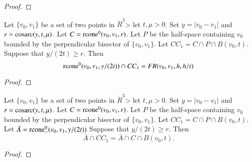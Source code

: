 \begin{tarskidata}
\begin{tarski}
\begin{proof}
\end{proof}
\end{tarski}






\begin{tarski}

\begin{lemma}
Let $\{v_0,v_1\}$ be a set of two points in $\ring{R}^3$>
let $t,\mu > 0$.  Set $y=|v_0-v_1|$
and $r={\operatorname{cosarc}}(y,t,\mu)$.
Let $C={\operatorname{rcone}}^0(v_0,v_1,r)$.
Let $P$ be the half-space containing $v_0$ bounded by
the perpendicular bisector of  $\{v_0,v_1\}$.
Let $CC_1 = C\cap P \cap B(v_0,t)$.
Suppose that $y/(2t) \ge r$.
Then
  $$
  {\operatorname{rcone}}^0(v_0,v_1,y/(2t))\cap CC_1 = FR(v_0,v_1,h,h/t)
  $$
\end{lemma}

\begin{proof}
\end{proof}
\end{tarski}





\begin{tarski}

\begin{lemma}
Let $\{v_0,v_1\}$ be a set of two points in $\ring{R}^3$>
let $t,\mu > 0$.  Set $y=|v_0-v_1|$
and $r={\operatorname{cosarc}}(y,t,\mu)$.
Let $C={\operatorname{rcone}}^0(v_0,v_1,r)$.
Let $P$ be the half-space containing $v_0$ bounded by
the perpendicular bisector of  $\{v_0,v_1\}$.
Let $CC_1 = C\cap P \cap B(v_0,t)$.
Let $\bar A = {\operatorname{rcone}}^0_-(v_0,v_1,y/(2t))$
Suppose that $y/(2t) \ge r$.
Then
  $$
  \bar A \cap CC_1 = \bar A \cap C \cap B(v_0,t).
  $$
\end{lemma}

\begin{proof}
\end{proof}
\end{tarski}






\end{tarskidata}
